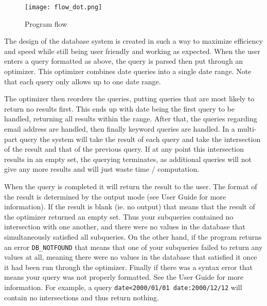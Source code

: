 \begin{figure}[!h]
	\centering
	\texttt{[image: flow\_dot.png]}
	\caption{Program flow}\label{fig:use_flow}
\end{figure}

The design of the database system is created in such a way to maximize efficiency and 
speed while still being user friendly and working as expected.  When the user enters 
a query formatted as above, the query is parsed then put through an optimizer.  This 
optimizer combines date queries into a single date range.  Note that each query only 
allows up to one date range.  

The optimizer then reorders the queries, putting queries 
that are most likely to return no results first.  This ends up with date being the 
first query to be handled, returning all results within the range.  After that, the 
queries regarding email address are handled, then finally keyword queries are handled.  
In a multi-part query the system will take the result of each query and take the 
intersection of the result and that of the previous query.  If at any point this 
intersection results in an empty set, the querying terminates, as additional queries 
will not give any more results and will just waste time / computation.  

When the query is completed it will return the result to the user.  The format of the 
result is determined by the output mode (see User Guide for more information).  If the 
result is blank (ie. no output) that means that the result of the optimizer returned 
an empty set.  Thus your subqueries contained no intersection with one another, and there 
were no values in the database that simultaneously satisfied all subqueries.  On the other 
hand, if the program returns an error \verb|DB_NOTFOUND| that means that one of your 
subqueries failed to return any values at all, meaning there were no values in the database 
that satisfied it once it had been run through the optimizer.  Finally if there was a 
syntax error that means your query was not properly formatted.  See the User Guide for 
more information.  For example, a query \verb|date<2000/01/01 date:2000/12/12| will 
contain no intersections and thus return nothing. 
